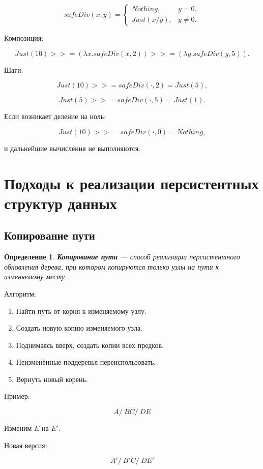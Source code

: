 \documentclass[12pt,a4paper]{article}
\newtheorem{definition}{Определение}
\begin{document}
\[
safeDiv(x,y) =
\begin{cases}
Nothing, & y = 0, \\
Just(x/y), & y \ne 0.
\end{cases}
\]

Композиция:

\[
Just(10) >>= (\lambda x. safeDiv(x,2)) >>= (\lambda y. safeDiv(y,5)).
\]

Шаги:

\[
Just(10) >>= safeDiv(\cdot,2) = Just(5),
\]

\[
Just(5) >>= safeDiv(\cdot,5) = Just(1).
\]

Если возникает деление на ноль:

\[
Just(10) >>= safeDiv(\cdot,0) = Nothing,
\]

и дальнейшие вычисления не выполняются.

\section{Подходы к реализации персистентных структур данных}

\subsection{Копирование пути}

\begin{definition}
\textbf{Копирование пути} --- способ реализации персистентного обновления дерева, при котором копируются только узлы на пути к изменяемому месту.
\end{definition}

Алгоритм:

\begin{enumerate}
  \item Найти путь от корня к изменяемому узлу.
  \item Создать новую копию изменяемого узла.
  \item Поднимаясь вверх, создать копии всех предков.
  \item Неизменённые поддеревья переиспользовать.
  \item Вернуть новый корень.
\end{enumerate}

Пример:

\[
        A
       / \
      B   C
     / \
    D   E
\]

Изменим $E$ на $E'$.

Новая версия:

\[
        A'
       /  \
      B'   C
     /  \
    D    E'
\]
\end{document}

